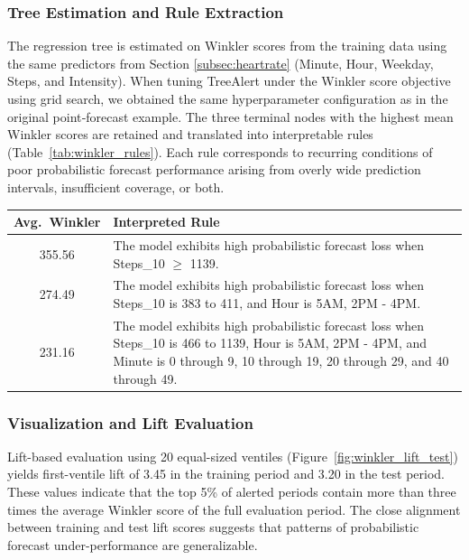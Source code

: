 \documentclass[12pt]{article}
\let\oldtable\table
\let\endoldtable\endtable
\renewenvironment{table}
  {\oldtable\spacingset{1}}
  {\endoldtable}
\begin{document}
\FloatBarrier
\subsubsection*{Tree Estimation and Rule Extraction}
The regression tree is estimated on Winkler scores from the training data using the same predictors from Section \ref{subsec:heartrate} (Minute, Hour, Weekday, Steps, and Intensity). When tuning TreeAlert under the Winkler score objective using grid search, we obtained the same hyperparameter configuration as in the original point‑forecast %
example. The three terminal nodes with the highest mean Winkler scores are retained and translated into interpretable rules (Table~\ref{tab:winkler_rules}). Each rule corresponds to recurring conditions of poor probabilistic forecast performance arising from overly wide prediction intervals, insufficient coverage, or both.

\begin{table}
\centering
\caption{Interpreted tree rules for terminal nodes with highest mean Winkler scores}
\label{tab:winkler_rules}
\small
\begin{tabular}{c p{12.5cm}}
\hline
\textbf{Avg.~Winkler} & \textbf{Interpreted Rule} \\
\hline
355.56 & The model exhibits high probabilistic forecast loss when Steps\_10 $\geq$ 1139. \\
274.49 & The model exhibits high probabilistic forecast loss when Steps\_10 is 383 to 411, and Hour is 5AM, 2PM - 4PM. \\
231.16 & The model exhibits high probabilistic forecast loss when Steps\_10 is 466 to 1139, Hour is 5AM, 2PM - 4PM, and Minute is 0 through 9, 10 through 19, 20 through 29, and 40 through 49. \\
\hline
\end{tabular}
\end{table}

\subsubsection*{Visualization and Lift Evaluation}

Lift-based evaluation using 20 equal-sized ventiles (Figure~\ref{fig:winkler_lift_test}) yields first-ventile lift of 3.45 in the training period and 3.20 in the test period. These values indicate that the top 5\% of alerted %
periods contain more than three times the average Winkler score of the full evaluation period. The close alignment between training and test lift scores suggests that patterns of probabilistic forecast under-performance are generalizable. %
\end{document}
